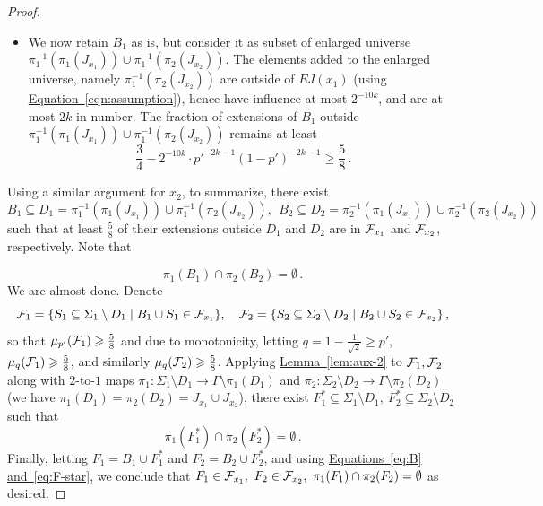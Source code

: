 \documentclass[11pt]{article}
\numberwithin{equation}{section}
\theoremstyle{definition}
\theoremstyle{plain}
\newcommand{\expref}[2]{\hyperref[#2]{#1~\ref{#2}}}
\newcommand{\expeqref}[2]{\hyperref[#2]{#1~\eqref{#2}}}
\renewcommand\geq{\geqslant}
\begin{document}
\begin{proof}
\begin{itemize}
      at least $\frac{3}{4}$ of extensions of $B_1$ outside $  \pi_1^{-1} ( \pi_1( J_{x_1} ) ) $
      are in ${\cal F}_{x_1}$.
\item We now retain $B_1$ as is, but consider it as subset of enlarged universe $ \pi_1^{-1}( \pi_1 ( J_{x_1}  ) ) \cup  \pi_1^{-1} ( \pi_2  ( J_{x_2} ) ) $.
      The elements added to the enlarged universe, namely  $\pi_1^{-1} ( \pi_2  ( J_{x_2} ) )$
      are outside of $EJ(x_1)$ (using \expeqref{Equation}{eqn:assumption}), hence have influence at most $2^{-10k}$, and are at most $2k$ in number. %
%
%
%
%
      The fraction of extensions of
      $B_1$ outside $ \pi_1^{-1}( \pi_1 ( J_{x_1}  ) ) \cup  \pi_1^{-1} ( \pi_2  ( J_{x_2} ) ) $
      remains at least $$\frac{3}{4}- 2^{-10k} \cdot {p'}^{-2k-1}(1-p')^{-2k-1} \geq \frac{5}{8}\,.$$%
\end{itemize}

Using a similar argument for $x_2$, to summarize, there exist
 $$ B_1 \subseteq  D_1 = \pi_1^{-1}( \pi_1 ( J_{x_1}  ) ) \cup  \pi_1^{-1} ( \pi_2  ( J_{x_2} ) )
     , \ \  B_2 \subseteq D_2  = \pi_2^{-1}( \pi_1 ( J_{x_1}  ) ) \cup  \pi_2^{-1} ( \pi_2  ( J_{x_2} ) )   $$
such that at least $\frac{5}{8}$ of their extensions outside
$D_1$ and $D_2$ %
%
are in ${\cal F}_{x_1}$ and ${\cal F}_{x_2}$, respectively.  %
Note that

 \begin{equation} \label{eq:B}
 \pi_1(B_1) \cap \pi_2(B_2) = \emptyset\,.%
 \end{equation}
 We are almost done.
 Denote
  $$ {\cal F}_1 = \{ S_1 \subseteq  \Sigma_1 \setminus D_1 \mid B_1 \cup S_1 \in {\cal F}_{x_1}\}, \quad
     {\cal F}_2 = \{ S_2 \subseteq  \Sigma_2 \setminus D_2 \mid B_2 \cup S_2 \in {\cal F}_{x_2}\}\,, $$%
so that $\mu_{p'} ({\cal F}_1) \geq \frac{5}{8}$ and due to monotonicity, letting $q = 1-\frac{1}{\sqrt{2}} \geq p'$, $\mu_{q} ({\cal F}_1) \geq \frac{5}{8}$,
and similarly    $\mu_{q} ({\cal F}_2) \geq \frac{5}{8}$.  Applying \expref{Lemma}{lem:aux-2} to $ {\cal F}_1, {\cal F}_2$ along with $2$-to-$1$
 maps $\pi_1: \Sigma_1 \setminus D_1 \to \Gamma
\setminus \pi_1(D_1)$  and  $\pi_2: \Sigma_2 \setminus D_2 \to \Gamma
\setminus \pi_2(D_2)$ (we have $\pi_1 (D_1) = \pi_2(D_2) = J_{x_1} \cup J_{x_2}$),
there exist $F_1^* \subseteq  \Sigma_1 \setminus D_1, ~F_2^* \subseteq  \Sigma_2 \setminus D_2$ such that
\begin{equation} \label{eq:F-star}
 \pi_1 (F_1^*)  \cap \pi_2 (F_2^*) = \emptyset\,.%
 \end{equation}
 Finally, letting $F_1 = B_1 \cup  F_1^*$  and  $F_2 = B_2 \cup  F_2^*$, and using
\expeqref{Equations}{eq:B} \expeqref{and}{eq:F-star}, %
we conclude that
 $F_1 \in {\cal F}_{x_1}, ~F_2 \in {\cal F}_{x_2}, ~\pi_1(F_1) \cap \pi_2(F_2) = \emptyset$ as desired.
 \end{proof}
\end{document}
